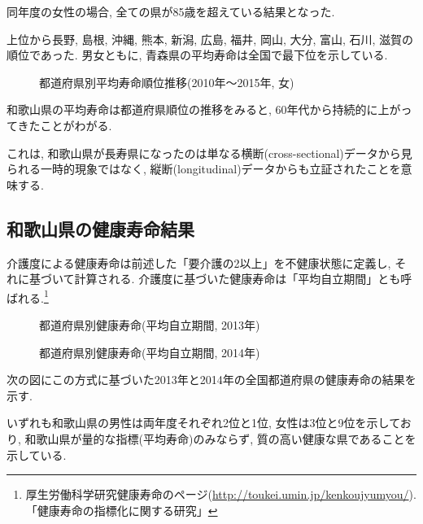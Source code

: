 同年度の女性の場合, 全ての県が85歳を超えている結果となった.

上位から長野, 島根, 沖縄, 熊本, 新潟, 広島, 福井, 岡山, 大分, 富山, 石川, 滋賀の順位であった.
男女ともに, 青森県の平均寿命は全国で最下位を示している.
\begin{figure}[h!]
	\begin{center}
		\caption{都道府県別平均寿命順位推移(2010年〜2015年, 女)}\end{center}
\end{figure}






和歌山県の平均寿命は都道府県順位の推移をみると,
60年代から持続的に上がってきたことがわがる.

これは, 和歌山県が長寿県になったのは単なる横断(cross-sectional)データから見られる一時的現象ではなく, 縦断(longitudinal)データからも立証されたことを意味する.


\subsection{和歌山県の健康寿命結果}
介護度による健康寿命は前述した「要介護の2以上」を不健康状態に定義し, それに基づいて計算される. 介護度に基づいた健康寿命は「平均自立期間」とも呼ばれる.\footnote{厚生労働科学研究健康寿命のページ(\url{http://toukei.umin.jp/kenkoujyumyou/}).
	「健康寿命の指標化に関する研究」
}
\begin{figure}[h!]
	\begin{center}
		\caption{都道府県別健康寿命(平均自立期間, 2013年)}\label{fig1}
	\end{center}
\end{figure}
\begin{figure}[h!]
	\begin{center}
		\caption{都道府県別健康寿命(平均自立期間, 2014年)}\label{fig1}
	\end{center}
\end{figure}
次の図にこの方式に基づいた2013年と2014年の全国都道府県の健康寿命の結果を示す.

いずれも和歌山県の男性は両年度それぞれ2位と1位, 女性は3位と9位を示しており, 和歌山県が量的な指標(平均寿命)のみならず, 質の高い健康な県であることを示している.

